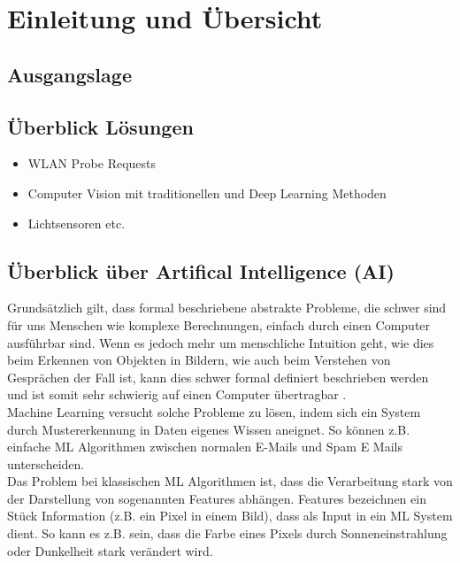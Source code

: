 \section{Einleitung und Übersicht}

\subsection{Ausgangslage}

\subsection{Überblick Lösungen}
\begin{itemize}
    \item WLAN Probe Requests
    \item Computer Vision mit traditionellen und Deep Learning Methoden
    \item Lichtsensoren etc.
\end{itemize}

\subsection{Überblick über Artifical Intelligence (AI)}
Grundsätzlich gilt, dass formal beschriebene abstrakte Probleme, die schwer sind für uns Menschen wie komplexe Berechnungen, einfach durch einen Computer ausführbar sind. Wenn es jedoch mehr um menschliche Intuition geht, wie dies beim Erkennen von Objekten in Bildern, wie auch beim Verstehen von Gesprächen der Fall ist, kann dies schwer formal definiert beschrieben werden und ist somit sehr schwierig auf einen Computer übertragbar \cite{good}. \\

Machine Learning versucht solche Probleme zu lösen, indem sich ein System durch Mustererkennung in Daten eigenes Wissen aneignet. So können z.B. einfache ML Algorithmen zwischen normalen E-Mails und Spam E Mails unterscheiden. \cite{good}\\

Das Problem bei klassischen ML Algorithmen ist, dass die Verarbeitung stark von der Darstellung von sogenannten Features abhängen. Features bezeichnen ein Stück Information (z.B. ein Pixel in einem Bild), dass als Input in ein ML System dient. So kann es z.B. sein, dass die Farbe eines Pixels durch Sonneneinstrahlung oder Dunkelheit stark verändert wird. \cite{good} \\

